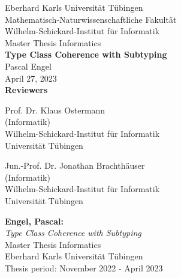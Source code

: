 \documentclass[twoside,12pt,a4paper]{report}
\begin{document}
 
\begin{titlepage}
 \begin{center}
  {\LARGE Eberhard Karls Universit\"at T\"ubingen}\\
  {\large Mathematisch-Naturwissenschaftliche Fakult\"at \\
Wilhelm-Schickard-Institut f\"ur Informatik\\[4cm]}
  {\huge Master Thesis Informatics\\[2cm]}
  {\Large\bf  Type Class Coherence with Subtyping\\[1.5cm]}
 {\large Pascal Engel}\\[0.5cm]
April 27, 2023 \\[4cm]
{\small\bf Reviewers}\\[0.5cm]
  \parbox{7cm}{\begin{center}{\large Prof. Dr. Klaus Ostermann}\\
   (Informatik)\\
  {\footnotesize Wilhelm-Schickard-Institut f\"ur Informatik\\
	Universit\"at T\"ubingen}\end{center}}\hfill\parbox{7cm}{\begin{center}
  {\large Jun.-Prof. Dr. Jonathan Brachth\"auser}\\
  (Informatik)\\
  {\footnotesize Wilhelm-Schickard-Institut f\"ur Informatik\\
	Universit\"at T\"ubingen}\end{center}
 }
  \end{center}
\end{titlepage}


\thispagestyle{empty}
\vspace*{\fill}
\begin{minipage}{11.2cm}
\textbf{Engel, Pascal:}\\
\emph{Type Class Coherence with Subtyping}\\ Master Thesis Informatics\\
Eberhard Karls Universit\"at T\"ubingen\\
Thesis period: November 2022 - April 2023
\end{minipage}
\newpage
\end{document}
